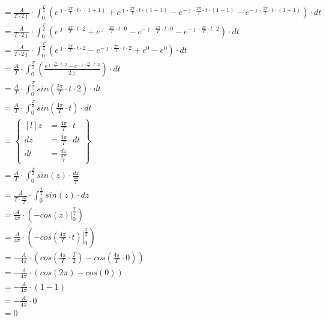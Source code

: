 \begin{task}
\begin{align*}
&=\frac{A}{T\cdot 2\jmath} \cdot \int_{0}^{\frac{T}{2}}
\left(e^{\jmath \cdot \frac{2\pi}{T} \cdot t \cdot \left(1+1\right)} + e^{\jmath \cdot \frac{2\pi}{T} \cdot t \cdot \left(1 - 1\right)} - e^{-\jmath \cdot \frac{2\pi}{T} \cdot t \cdot \left(1 -1\right)} - e^{-\jmath \cdot \frac{2\pi}{T} \cdot t \cdot \left(1+1\right)} \right) \cdot dt\\
&=\frac{A}{T\cdot 2\jmath} \cdot \int_{0}^{\frac{T}{2}}
\left(e^{\jmath \cdot \frac{2\pi}{T} \cdot t \cdot 2} + e^{\jmath \cdot \frac{2\pi}{T} \cdot t \cdot 0} - e^{-\jmath \cdot \frac{2\pi}{T} \cdot t \cdot 0} - e^{-\jmath \cdot \frac{2\pi}{T} \cdot t \cdot 2} \right) \cdot dt\\
&=\frac{A}{T\cdot 2\jmath} \cdot \int_{0}^{\frac{T}{2}}
\left(e^{\jmath \cdot \frac{2\pi}{T} \cdot t \cdot 2} - e^{-\jmath \cdot \frac{2\pi}{T} \cdot t \cdot 2} + e^{0} - e^{0} \right) \cdot dt\\
&=\frac{A}{T} \cdot \int_{0}^{\frac{T}{2}}
\left( \frac{e^{\jmath \cdot \frac{2\pi}{T} \cdot t \cdot 2} - e^{-\jmath \cdot \frac{2\pi}{T} \cdot t \cdot 2}}{2\jmath} \right) \cdot dt\\
&=\frac{A}{T} \cdot \int_{0}^{\frac{T}{2}}
sin\left( \frac{2\pi}{T} \cdot t \cdot 2 \right) \cdot dt\\
&=\frac{A}{T} \cdot \int_{0}^{\frac{T}{2}}
sin\left( \frac{4\pi}{T} \cdot t \right) \cdot dt\\
&=\begin{Bmatrix*}[l]
z&=\frac{4\pi}{T} \cdot t\\
dz&=\frac{4\pi}{T} \cdot dt\\
dt&=\frac{dz}{\frac{4\pi}{T}}
\end{Bmatrix*}\\
&=\frac{A}{T} \cdot \int_{0}^{\frac{T}{2}} sin\left( z \right) \cdot \frac{dz}{\frac{4\pi}{T}}\\
&=\frac{A}{T\cdot \frac{4\pi}{T}} \cdot \int_{0}^{\frac{T}{2}} sin\left( z \right) \cdot dz\\
&=\frac{A}{4\pi} \cdot \left(\left. -cos\left( z \right) \right|_{0}^{\frac{T}{2}} \right)\\
&=\frac{A}{4\pi} \cdot \left(\left. -cos\left( \frac{4\pi}{T} \cdot t \right) \right|_{0}^{\frac{T}{2}} \right)\\
&=-\frac{A}{4\pi} \cdot \left(cos\left( \frac{4\pi}{T} \cdot \frac{T}{2} \right) -cos\left( \frac{4\pi}{T} \cdot 0 \right) \right)\\
&=-\frac{A}{4\pi} \cdot \left(cos\left( 2\pi \right) -cos\left( 0 \right) \right)\\
&=-\frac{A}{4\pi} \cdot \left(1 -1 \right)\\
&=-\frac{A}{4\pi} \cdot 0\\
&=0
\end{align*}


\end{task}
